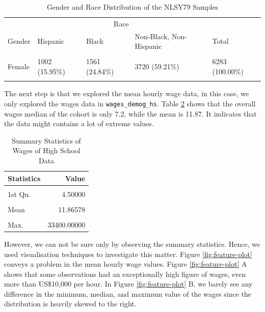 \documentclass{article}
\begin{document}
\begin{table}

\caption{\label{tab:gender-race-table}Gender and Race Distribution of the NLSY79 Samples}
\centering
\begin{tabular}[t]{l|l|l|l|l}
\hline
\multicolumn{1}{c|}{ } & \multicolumn{3}{c|}{Race} & \multicolumn{1}{c}{ } \\
\cline{2-4}
Gender & Hispanic & Black & Non-Black, Non-Hispanic & Total\\
\hline
\cellcolor{gray!6}{Male} & \cellcolor{gray!6}{1000 (15.62\%)} & \cellcolor{gray!6}{1613 (25.19\%)} & \cellcolor{gray!6}{3790 (59.19\%)} & \cellcolor{gray!6}{6403 (100.00\%)}\\
\hline
Female & 1002 (15.95\%) & 1561 (24.84\%) & 3720 (59.21\%) & 6283 (100.00\%)\\
\hline
\cellcolor{gray!6}{Total} & \cellcolor{gray!6}{2002 (15.78\%)} & \cellcolor{gray!6}{3174 (25.02\%)} & \cellcolor{gray!6}{7510 (59.20\%)} & \cellcolor{gray!6}{12686 (100.00\%)}\\
\hline
\end{tabular}
\end{table}

The next step is that we explored the mean hourly wage data, in this case, we only explored the wages data in \texttt{wages\_demog\_hs}. Table \ref{tab:summarytable} shows that the overall wages median of the cohort is only 7.2, while the mean is 11.87. It indicates that the data might contains a lot of extreme values.

\begin{table}

\caption{\label{tab:summarytable}Summary Statistics of Wages of High School Data}
\centering
\begin{tabular}[t]{l|r}
\hline
Statistics & Value\\
\hline
\cellcolor{gray!6}{Min.} & \cellcolor{gray!6}{0.01000}\\
\hline
1st Qu. & 4.50000\\
\hline
\cellcolor{gray!6}{Median} & \cellcolor{gray!6}{7.20000}\\
\hline
Mean & 11.86578\\
\hline
\cellcolor{gray!6}{3rd Qu.} & \cellcolor{gray!6}{11.74000}\\
\hline
Max. & 33400.00000\\
\hline
\end{tabular}
\end{table}

However, we can not be sure only by observing the summary statistics. Hence, we used visualisation techniques to investigate this matter. Figure \ref{fig:feature-plot} conveys a problem in the mean hourly wage values. Figure \ref{fig:feature-plot} A shows that some observations had an exceptionally high figure of wages, even more than US\$10,000 per hour. In Figure \ref{fig:feature-plot} B, we barely see any difference in the minimum, median, and maximum value of the wages since the distribution is heavily skewed to the right.
\end{document}
